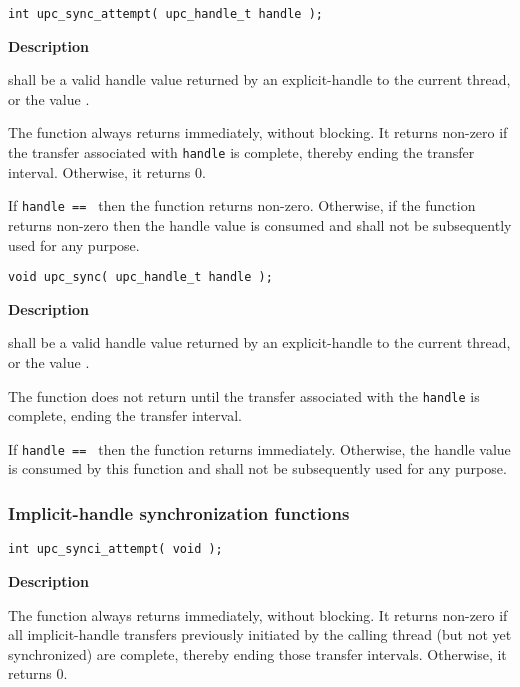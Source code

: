\begin{verbatim}
int upc_sync_attempt( upc_handle_t handle ); 
\end{verbatim}

{\bf Description}

 shall be a valid handle value returned by
an explicit-handle \TIF to the current thread, or the value \complete.

\np The \func function always returns immediately, without blocking.
It returns non-zero if the transfer associated with 
{\tt handle} is complete, thereby ending the transfer interval.
Otherwise, it returns 0.

\np If {\tt handle == \complete} then the \func function returns non-zero.
Otherwise, if the function returns non-zero then the handle value is consumed 
and shall not be subsequently used for any purpose.

\def\bfunc{upc\_sync}
\funcheader

\begin{verbatim}
void upc_sync( upc_handle_t handle );
\end{verbatim}

{\bf Description}

 shall be a valid handle value returned by
an explicit-handle \TIF to the current thread, or the value \complete.

\np The \func function does not return until the transfer associated
with the {\tt handle} is complete, ending the transfer interval.

\np If {\tt handle == \complete} then the \func function returns immediately.
Otherwise, the handle value is consumed by this function and shall not be 
subsequently used for any purpose.

\newpage
\subsubsection{Implicit-handle synchronization functions}
\def\bfunc{upc\_synci\_attempt}
\funcheader

\begin{verbatim}
int upc_synci_attempt( void );
\end{verbatim}

{\bf Description}

\np The \func function always returns immediately, without blocking.
It returns non-zero if all implicit-handle transfers
previously initiated by the calling thread (but not yet synchronized) are complete, 
thereby ending those transfer intervals. Otherwise, it returns 0.

